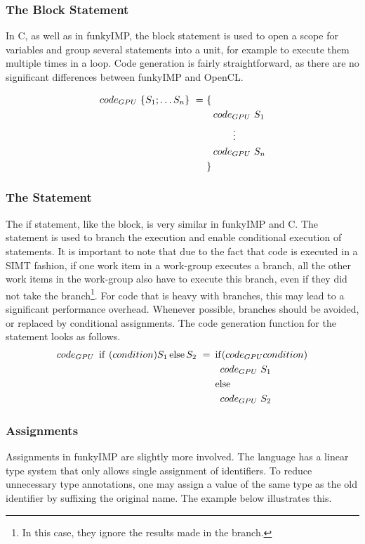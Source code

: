 \subsubsection{The Block Statement}
In C, as well as in funkyIMP, the block statement is used to open a scope for variables and group several statements into a unit, for example to execute them multiple times in a loop. Code generation is fairly straightforward, as there are no significant differences between funkyIMP and OpenCL.

\begin{align}
	code_{GPU}\ \{S_1;\dotsc S_n\}\ =	&\ \{\\
							&\quad code_{GPU}\ S_1\notag\\
							&\quad\qquad\vdots\notag\\
							&\quad code_{GPU}\ S_n\notag\\
							&\ \}\notag
\end{align}

\subsubsection{The  Statement}
The if statement, like the block, is very similar in funkyIMP and C. The  statement is used to branch the execution and enable conditional execution of statements. It is important to note that due to the fact that code is executed in a SIMT fashion, if one work item in a work-group executes a branch, all the other work items in the work-group also have to execute this branch, even if they did not take the branch\footnote{In this case, they ignore the results made in the branch.}. For code that is heavy with branches, this may lead to a significant performance overhead. Whenever possible, branches should be avoided, or replaced by conditional assignments. The code generation function for the  statement looks as follows. \\

\begin{align}
	code_{GPU}\ \operatorname{if}\ (condition) S_1 \operatorname{else} S_2\ =	&\ \operatorname{if} (code_{GPU} condition)\\
											&\quad code_{GPU}\ S_1 \notag\\
											&\ \operatorname{else} \notag\\
											&\quad code_{GPU}\ S_2 \notag
\end{align}

\subsubsection{Assignments}
Assignments in funkyIMP are slightly more involved. The language has a linear type system that only allows single assignment of identifiers. To reduce unnecessary type annotations, one may assign a value of the same type as the old identifier by suffixing the original name. The example below illustrates this.


